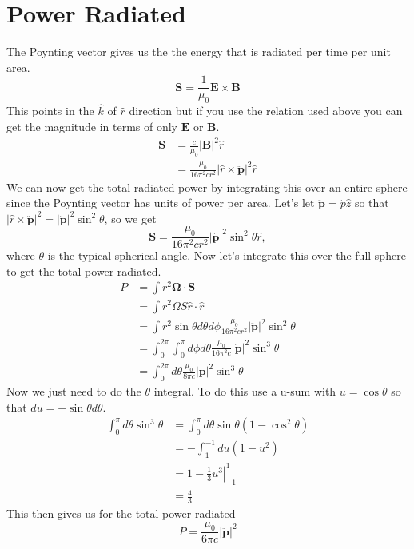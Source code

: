 \documentclass[12pt]{article}
\newcommand{\pdd}{\ddot{\mathbf{p}}}
\begin{document}
\section*{Power Radiated}
The Poynting vector gives us the the energy that is radiated per time per unit area.
\begin{equation}
   \mathbf{S}=\frac{1}{\mu_0} \mathbf{E} \times \mathbf{B}
\end{equation}
This points in the $\hat{k}$ of $\hat{r}$ direction but if you use the relation used above you can get the magnitude in terms of only $\mathbf{E}$ or $\mathbf{B}$.
\begin{align}
   \mathbf{S} &= \frac{c}{\mu_0} |\mathbf{B}|^2\hat{r} \\
   &= \frac{\mu_0}{16\pi^2 c r^2} |\hat{r}\times\pdd|^2 \hat{r}
\end{align}
We can now get the total radiated power by integrating this over an entire sphere since the Poynting vector has units of power per area. Let's let $\pdd = \ddot{p}\hat{z}$ so that $|\hat{r}\times\pdd|^2 = |\pdd|^2\sin^2 \theta$, so we get
\begin{equation}
   \mathbf{S} = \frac{\mu_0}{16\pi^2 c r^2} |\pdd|^2\sin^2 \theta \hat{r},
\end{equation}
where $\theta$ is the typical spherical angle. Now let's integrate this over the full sphere to get the total power radiated.
\begin{align}
   P &= \int r^2 \mathbf{\Omega}\cdot\mathbf{S} \\
   &= \int r^2 \Omega S \hat{r}\cdot\hat{r} \\
   &= \int r^2\sin\theta d\theta d\phi \frac{\mu_0}{16\pi^2cr^2}|\pdd|^2\sin^2\theta \\
   &= \int_0^{2\pi} \int_0^\pi d\phi d\theta \frac{\mu_0}{16\pi^2c} |\pdd|^2 \sin^3\theta \\
   &= \int_0^{2\pi} d\theta \frac{\mu_0}{8\pi c} |\pdd|^2 \sin^3\theta
\end{align}
Now we just need to do the $\theta$ integral. To do this use a u-sum with $u=\cos\theta$ so that $du=-\sin\theta d\theta$.
\begin{align}
   \int_0^\pi d\theta \sin^3\theta &= \int_0^\pi d\theta \sin\theta(1-\cos^2\theta) \\
   &= -\int_1^{-1} du (1-u^2) \\
   &= \left. 1-\frac{1}{3}u^3\right|_{-1}^1 \\
   &= \frac{4}{3}
\end{align}
This then gives us for the total power radiated
\begin{equation}
   P = \frac{\mu_0}{6\pi c} |\pdd|^2
\end{equation}
\end{document}
